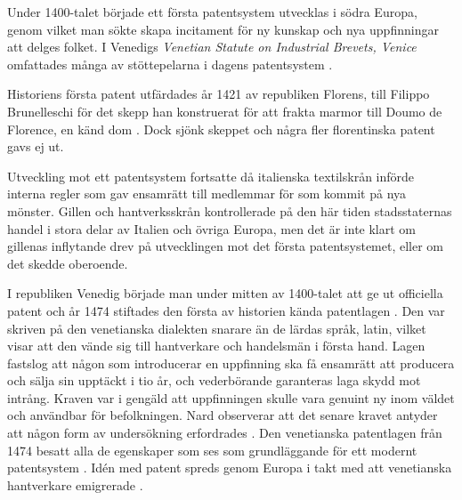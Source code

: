 Under 1400-talet började ett första patentsystem utvecklas i södra Europa, genom vilket man sökte skapa incitament för ny kunskap och nya uppfinningar att delges folket. 
I Venedigs \emph{Venetian Statute on Industrial Brevets, Venice} omfattades många av stöttepelarna i dagens patentsystem \cite{nard}.

Historiens första patent utfärdades år 1421 av republiken Florens, till Filippo Brunelleschi för det skepp han konstruerat för att frakta marmor till Doumo de Florence, en känd dom \cite{frumkin}. 
Dock sjönk skeppet och några fler florentinska patent gavs ej ut.

Utveckling mot ett patentsystem fortsatte då italienska textilskrån införde interna regler som gav ensamrätt till medlemmar för som kommit på nya mönster.
Gillen och hantverksskrån kontrollerade på den här tiden stadsstaternas handel i stora delar av Italien och övriga Europa, men det är inte klart om gillenas inflytande drev på utvecklingen mot det första patentsystemet, eller om det skedde oberoende.

I republiken Venedig började man under mitten av 1400-talet att ge ut officiella patent och år 1474 stiftades den första av historien kända patentlagen \cite{frumkin}.
Den var skriven på den venetianska dialekten snarare än de lärdas språk, latin, vilket visar att den vände sig till hantverkare och handelsmän i första hand.
Lagen fastslog att någon som introducerar en uppfinning ska få ensamrätt att producera och sälja sin upptäckt i tio år, och vederbörande garanteras laga skydd mot intrång. 
Kraven var i gengäld att uppfinningen skulle vara genuint ny inom väldet och användbar för befolkningen. 
Nard observerar att det senare kravet antyder att någon form av undersökning erfordrades \cite{nard}. 
Den venetianska patentlagen från 1474 besatt alla de egenskaper som ses som grundläggande för ett modernt patentsystem \cite{nard}. Idén med patent spreds genom Europa i takt med att venetianska hantverkare emigrerade \cite{nard}. 



